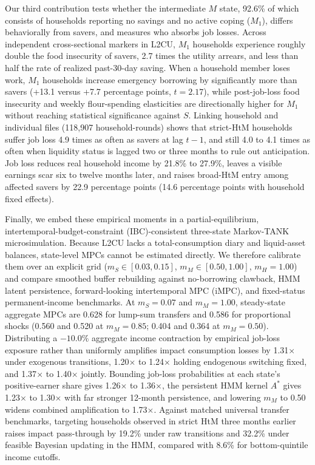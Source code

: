 \documentclass[11pt]{article}
\begin{document}
Our third contribution tests whether the intermediate $M$ state, 92.6\% of which consists of households reporting no savings and no active coping ($M_1$), differs behaviorally from savers, and measures who absorbs job losses. Across independent cross-sectional markers in L2CU, $M_1$ households experience roughly double the food insecurity of savers, 2.7 times the utility arrears, and less than half the rate of realized past-30-day saving. When a household member loses work, $M_1$ households increase emergency borrowing by significantly more than savers (+13.1 versus +7.7 percentage points, $t = 2.17$), while post-job-loss food insecurity and weekly flour-spending elasticities are directionally higher for $M_1$ without reaching statistical significance against $S$. Linking household and individual files (118,907 household-rounds) shows that strict-HtM households suffer job loss 4.9 times as often as savers at lag $t-1$, and still 4.0 to 4.1 times as often when liquidity status is lagged two or three months to rule out anticipation. Job loss reduces real household income by 21.8\% to 27.9\%, leaves a visible earnings scar six to twelve months later, and raises broad-HtM entry among affected savers by 22.9 percentage points (14.6 percentage points with household fixed effects).

Finally, we embed these empirical moments in a partial-equilibrium, intertemporal-budget-constraint (IBC)-consistent three-state Markov-TANK microsimulation. Because L2CU lacks a total-consumption diary and liquid-asset balances, state-level MPCs cannot be estimated directly. We therefore calibrate them over an explicit grid ($m_S \in [0.03, 0.15]$, $m_M \in [0.50, 1.00]$, $m_H = 1.00$) and compare smoothed buffer rebuilding against no-borrowing clawback, HMM latent persistence, forward-looking intertemporal MPC (iMPC), and fixed-status permanent-income benchmarks. At $m_S = 0.07$ and $m_M = 1.00$, steady-state aggregate MPCs are 0.628 for lump-sum transfers and 0.586 for proportional shocks (0.560 and 0.520 at $m_M = 0.85$; 0.404 and 0.364 at $m_M = 0.50$). Distributing a $-10.0\%$ aggregate income contraction by empirical job-loss exposure rather than uniformly amplifies impact consumption losses by 1.31$\times$ under exogenous transitions, 1.20$\times$ to 1.24$\times$ holding endogenous switching fixed, and 1.37$\times$ to 1.40$\times$ jointly. Bounding job-loss probabilities at each state's positive-earner share gives 1.26$\times$ to 1.36$\times$, the persistent HMM kernel $A^*$ gives 1.23$\times$ to 1.30$\times$ with far stronger 12-month persistence, and lowering $m_M$ to 0.50 widens combined amplification to 1.73$\times$. Against matched universal transfer benchmarks, targeting households observed in strict HtM three months earlier raises impact pass-through by 19.2\% under raw transitions and 32.2\% under feasible Bayesian updating in the HMM, compared with 8.6\% for bottom-quintile income cutoffs.
\end{document}
